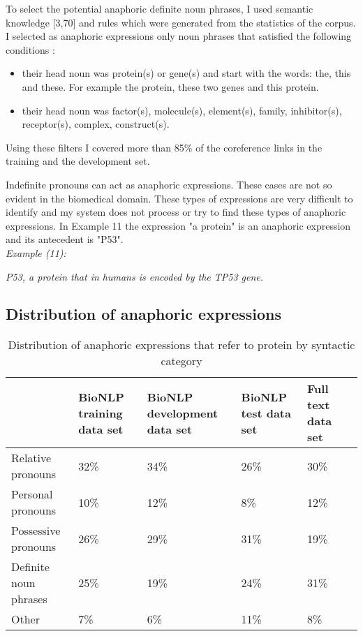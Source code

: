 To select the potential anaphoric definite noun phrases, I used semantic knowledge [3,70] and  rules which were generated from the statistics of the corpus. I selected as anaphoric expressions only noun phrases that satisfied the following conditions :

\begin{itemize}
	\item their head noun was protein(s) or gene(s) and start with the words: the, this and these. For example the protein, these two genes and this protein.
	\item their head noun was factor(s), molecule(s), element(s), family, inhibitor(s), receptor(s), complex, construct(s). 
\end{itemize}

Using these filters I covered more than 85\% of the coreference links in the training and the development set.

Indefinite pronouns can act as anaphoric expressions. These cases are not so evident in the biomedical domain. These types of expressions are very difficult to identify and my system does not process or try to find these types of anaphoric expressions. In Example 11 the expression "a protein" is an anaphoric expression and its antecedent is "P53". \\

\emph{Example (11):}
\begin{changemargin}{10mm}{10mm} 
  \emph{P53, a protein that in humans is encoded by the TP53 gene.}  
\end{changemargin} 
\vspace{4mm}

\subsection{Distribution of anaphoric expressions}
\begin{table}[h]
\centering
   \begin{center}
	 \begin{tabular}{l | C{2cm} C{2cm} C{2cm} C{2cm} @{}m{0pt}@{}}
 		
  		& {\footnotesize BioNLP training data set} & {\footnotesize BioNLP development data set} & {\footnotesize BioNLP test data set} & {\footnotesize Full text data set}&\\
 		\hline
 		Relative pronouns & 32\% & 34\% & 26\% & 30\% &\\[1.1ex]
 		\hline 
 		Personal pronouns & 10\% & 12\% & 8\% &12\% &\\ [1.1ex]
 		\hline   
 		Possessive pronouns & 26\% & 29\% & 31\% &19\% &\\ [1.1ex]
 		\hline  
 		Definite noun phrases & 25\% & 19\% & 24\% & 31\% &\\[1.1ex]
 		\hline  
 		Other & 7\% & 6\% & 11\% &8\% &\\ [1.1 ex]
 		\hline   
	\end{tabular}
  \end{center} 
  \caption{ Distribution of anaphoric expressions that refer to protein by  syntactic category}
\end{table}
  
